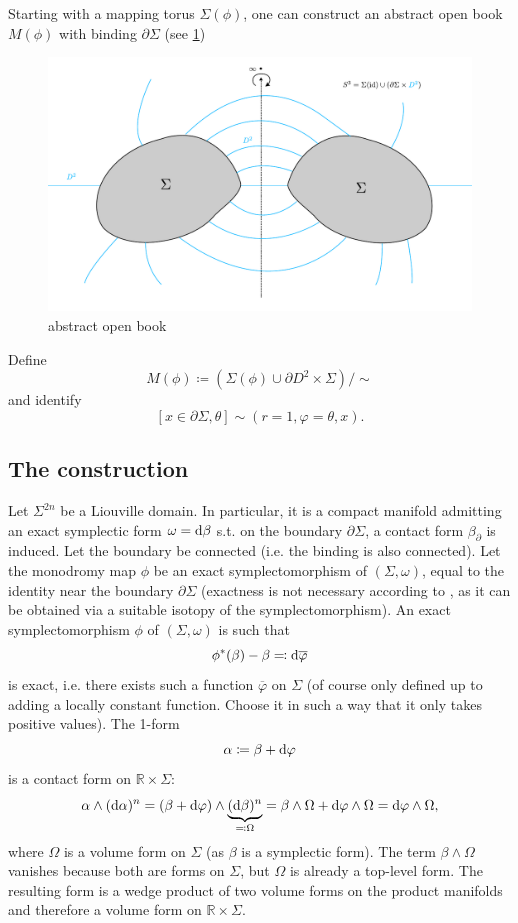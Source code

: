 Starting with a mapping torus $\Sigma(\phi)$, one can construct an abstract open book $M(\phi)$ with binding $\partial \Sigma$ (see \cref{fig:abstract_open_book})
\begin{figure}[ht]
    \includegraphics*[width=\textwidth]{images/abstract_open_book.pdf}
    \caption[abstract open book]{abstract open book}
    \label{fig:abstract_open_book}
\end{figure}

Define
\[
    M(\phi) \coloneqq \left(\Sigma(\phi) \cup \partial D^2 \times \Sigma\right)/\sim
\]
and identify
\[
    [x \in \partial \Sigma, \theta] \sim (r=1, \varphi = \theta, x).
\]


\subsection*{The construction}

Let $\Sigma^{2n}$ be a Liouville domain. 
In particular, it is a compact manifold admitting an exact symplectic form $\omega = \mathrm{d} \beta$ 
s.t. on the boundary $\partial \Sigma$, a contact form $\beta_\partial$ is induced.
Let the boundary be connected (i.e. the binding is also connected).
Let the monodromy map $\phi$ be an exact symplectomorphism of $(\Sigma, \omega)$,
equal to the identity near the boundary $\partial \Sigma$ 
(exactness is not necessary according to \cite{Geiges08}, as it can be obtained via a suitable isotopy of the symplectomorphism).
An exact symplectomorphism $\phi$ of $(\Sigma, \omega)$ is such that
\[
    \phi^*(\beta) - \beta \eqqcolon \mathrm{d} \overline{\varphi}  
\]
is exact, i.e. there exists such a function $\overline{\varphi}$ on $\Sigma$ (of course only defined up to adding a locally constant function. Choose it in such a way that it only takes positive values).
The 1-form 
\[
    \alpha \coloneqq \beta + \mathrm{d} \varphi
\]
is a contact form on $\mathbb R \times \Sigma$:
\[
    \alpha \wedge (\mathrm{d} \alpha)^{n} = (\beta + \mathrm{d} \varphi)\wedge \underbrace{(\mathrm{d} \beta)^n}_{\eqqcolon \Omega} = \beta \wedge \Omega + \mathrm{d} \varphi \wedge \Omega = \mathrm{d} \varphi \wedge \Omega,
\]
where $\Omega$ is a volume form on $\Sigma$ (as $\beta$ is a symplectic form).
The term $\beta \wedge \Omega$ vanishes because both are forms on $\Sigma$, but $\Omega$ is already a top-level form.
The resulting form is a wedge product of two volume forms on the product manifolds and therefore a volume form on $\mathbb R \times \Sigma$.


